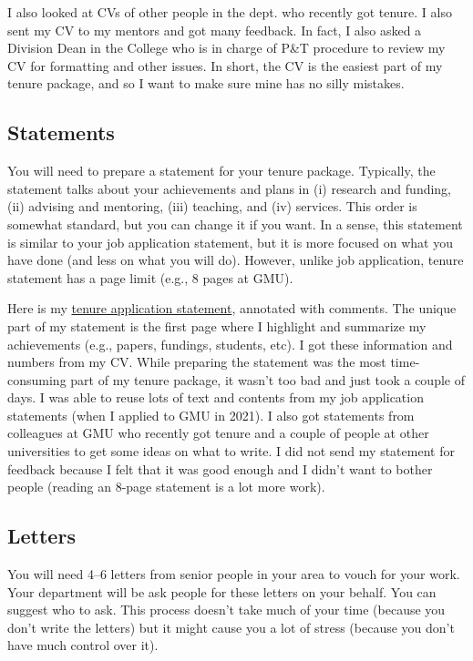 \documentclass[oneside,11pt,dvipsnames]{book}
\begin{document}
I also looked at CVs of other people in the dept. who recently got tenure. I also sent my CV to  my mentors and got many feedback. In fact, I also asked a Division Dean in the College who is in charge of P\&T procedure to review my CV for formatting and other issues. In short, the CV is the easiest part of my tenure package, and so I want to make sure mine has no silly mistakes.

\subsection{Statements}

You will need to prepare a statement for your tenure package.  Typically, the statement talks about your achievements and plans in (i) research and funding, (ii) advising and mentoring, (iii) teaching, and (iv) services. This order is somewhat standard, but you can change it if you want. In a sense, this statement is similar to your job application statement, but it is more focused on what you have done (and less on what you will do). However, unlike job application, tenure statement has a page limit (e.g., 8 pages at GMU).

Here is my \href{https://dynaroars.github.io/people/nguyenthanhvuh/files/pt/statement-annotated.pdf}{tenure application statement}, annotated with comments. The unique part of my statement is the first page where I highlight and summarize my achievements (e.g., papers, fundings, students, etc). I got these information and numbers from my CV.
While preparing the statement was the most time-consuming part of my tenure package, it wasn't too bad and just took a couple of days.  I was able to reuse lots of text and contents from my job application statements (when I applied to GMU in 2021). I also got statements from colleagues at GMU who recently got tenure and a couple of people at other universities to get some ideas on what to write.  I did not send my statement for feedback because I felt that it was good enough and I didn't want to bother people (reading an 8-page statement is a lot more work).

\subsection{Letters}
You will need 4--6 letters from senior people in your area to vouch for your work. Your department will be ask people for these letters on your behalf. You can suggest who to ask.  This process doesn't take much of your time (because you don't write the letters) but it might cause you a lot of stress (because you don't have much control over it).
\end{document}

